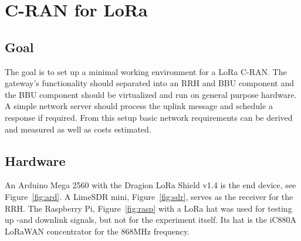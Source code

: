 \chapter{C-RAN for LoRa}
\label{chap:cran_for_lora}

\section{Goal}
The goal is to set up a minimal working environment for a LoRa C-RAN.
The gateway's functionality should separated into an RRH and BBU component and the 
BBU component should be virtualized and run on general purpose hardware. 
A simple network server should process the uplink message and schedule a response if required. From this setup 
basic network requirements can be derived and measured as well as costs estimated.

\section{Hardware}
An Arduino Mega 2560 with the Dragion LoRa Shield v1.4 is the end device, see Figure~\ref{fig:ard}.
A LimeSDR mini, Figure~\ref{fig:sdr}, serves as the receiver for the RRH.
The Raspberry Pi, Figure~\ref{fig:rasp} with a LoRa hat was used for testing up -and downlink signals, but not for the experiment itself. 
Its hat is the iC880A LoRaWAN concentrator for the 868MHz frequency.

